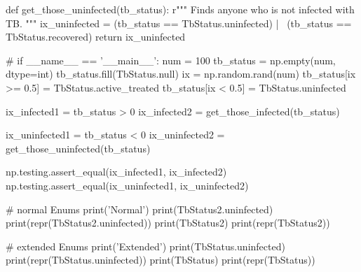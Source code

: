 \documentclass[12pt]{article}
\begin{document}
\begin{Python}
def get_those_uninfected(tb_status):
    r"""
    Finds anyone who is not infected with TB.
    """
    ix_uninfected = (tb_status == TbStatus.uninfected) | \
        (tb_status == TbStatus.recovered)
    return ix_uninfected

#%
if __name__ == '__main__':
    num = 100
    tb_status = np.empty(num, dtype=int)
    tb_status.fill(TbStatus.null)
    ix = np.random.rand(num)
    tb_status[ix >= 0.5] = TbStatus.active_treated
    tb_status[ix <  0.5] = TbStatus.uninfected


    ix_infected1 = tb_status > 0
    ix_infected2 = get_those_infected(tb_status)

    ix_uninfected1 = tb_status < 0
    ix_uninfected2 = get_those_uninfected(tb_status)

    np.testing.assert_equal(ix_infected1, ix_infected2)
    np.testing.assert_equal(ix_uninfected1, ix_uninfected2)

    # normal Enums
    print('Normal')
    print(TbStatus2.uninfected)
    print(repr(TbStatus2.uninfected))
    print(TbStatus2)
    print(repr(TbStatus2))

    # extended Enums
    print('Extended')
    print(TbStatus.uninfected)
    print(repr(TbStatus.uninfected))
    print(TbStatus)
    print(repr(TbStatus))
\end{Python}
\end{document}
